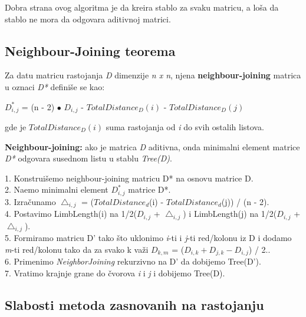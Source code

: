 Dobra strana ovog algoritma je da kreira stablo za svaku matricu, a lo\v{s}a da stablo ne mora da odgovara aditivnoj matrici.

\subsection{Neighbour-Joining teorema}
\label{subsec:njt}

Za datu matricu rastojanja \textit{D} dimenzije \textit{n x n}, njena \textbf{neighbour-joining} matrica u oznaci \textit{D*} defini\v{s}e se kao:\\
\begin{center}
$D^*_{i, j}$ = (n - 2) $\bullet$ $D_{i, j}$ - $TotalDistance_D(i)$ - $TotalDistance_D(j)$
\end{center}

 gde je $TotalDistance_D(i)$ suma rastojanja od \textit{i} do svih ostalih listova.

\begin{teorema}
\textbf{Neighbour-joining:} ako je matrica \textit{D} aditivna, onda minimalni element matrice \textit{D*} odgovara susednom listu u stablu \textit{Tree(D)}.
\end{teorema}

\begin{tcolorbox}
1. Konstrui\v{s}emo neighbour-joining matricu D* na osnovu matrice D.\\
2. Na\dj emo minimalni element $D^*_{i, j}$ matrice D*.\\
3. Izra\v{c}unamo $\bigtriangleup_{i, j}$ = ($TotalDistance_d$(i) - $TotalDistance_d$(j)) / (n - 2).\\
4. Postavimo LimbLength(i) na 1/2($D_{i, j}$ + $\bigtriangleup_{i, j}$) i LimbLength(j) na 1/2($D_{i, j}$ + $\bigtriangleup_{i, j}$).\\
5. Formiramo matricu D' tako \v{s}to uklonimo \textit{i}-ti i \textit{j}-ti red/kolonu iz D i dodamo \textit{m}-ti red/kolonu tako da za svako k va\v{z}i $D_{k, m}$ = ($D_{i, k} + D_{j, k} - D_{i, j}$) / 2..\\
6. Primenimo \textit{NeighborJoining} rekurzivno na D' da dobijemo Tree(D').\\
7. Vratimo krajnje grane do \v{c}vorova \textit{i} i \textit{j} i dobijemo Tree(D).
\end{tcolorbox}

\subsection{Slabosti metoda zasnovanih na rastojanju}
\label{subsec:smznr}

